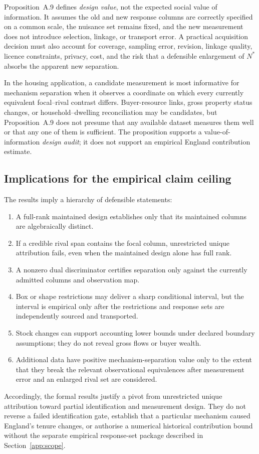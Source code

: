 Proposition~A.9 defines \emph{design value}, not the expected social value of
information. It assumes the old and new response columns are correctly
specified on a common scale, the nuisance set remains fixed, and the new
measurement does not introduce selection, linkage, or transport error. A
practical acquisition decision must also account for coverage, sampling error,
revision, linkage quality, licence constraints, privacy, cost, and the risk that
a defensible enlargement of \(N^*\) absorbs the apparent new separation.

In the housing application, a candidate measurement is most informative for
mechanism separation when it observes a coordinate on which every currently
equivalent focal--rival contrast differs. Buyer-resource links, gross property
status changes, or household--dwelling reconciliation may be candidates, but
Proposition~A.9 does not presume that any available dataset measures them well
or that any one of them is sufficient. The proposition supports a
value-of-information \emph{design audit}; it does not support an empirical
England contribution estimate.

\subsection{Implications for the empirical claim ceiling}
\label{app:claim-ceiling}

The results imply a hierarchy of defensible statements:
\begin{enumerate}
  \item A full-rank maintained design establishes only that its maintained
        columns are algebraically distinct.
  \item If a credible rival span contains the focal column, unrestricted
        unique attribution fails, even when the maintained design alone has
        full rank.
  \item A nonzero dual discriminator certifies separation only against the
        currently admitted columns and observation map.
  \item Box or shape restrictions may deliver a sharp conditional interval,
        but the interval is empirical only after the restrictions and response
        sets are independently sourced and transported.
  \item Stock changes can support accounting lower bounds under declared
        boundary assumptions; they do not reveal gross flows or buyer wealth.
  \item Additional data have positive mechanism-separation value only to the
        extent that they break the relevant observational equivalences after
        measurement error and an enlarged rival set are considered.
\end{enumerate}

Accordingly, the formal results justify a pivot from unrestricted unique
attribution toward partial identification and measurement design. They do not
reverse a failed identification gate, establish that a particular mechanism
caused England's tenure changes, or authorise a numerical historical
contribution bound without the separate empirical response-set package
described in Section~\ref{app:scope}.
